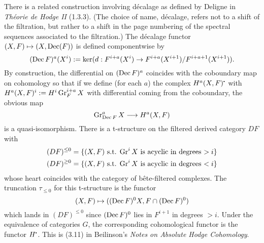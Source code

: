 \documentclass[deligne.tex]{subfiles}
\begin{document}
\begin{remark}
	There is a related construction involving
	décalage as defined by Deligne in \emph{Théorie de Hodge II} (1.3.3).
	(The choice of name, décalage, refers not to a shift of the filtration,
	but rather to a shift in the page numbering of the spectral sequences
	associated to the filtration.) The décalage functor
	$(X,F)\mapsto(X,\operatorname{Dec}(F))$ is defined componentwise by
	\begin{equation*}
		(\operatorname{Dec} F)^a(X^i)
		:=\ker(d:F^{i+a}(X^i)\rightarrow F^{i+a}(X^{i+1})/F^{i+a+1}(X^{i+1})).
	\end{equation*}
	By construction, the differential on $(\operatorname{Dec} F)^a$ coincides with the
	coboundary map on cohomology so that if we define (for each $a$) the
	complex $H^a(X,F)^\dotp$ with $H^a(X,F)^i:=H^i\operatorname{Gr}_F^{i+a}X$ with
	differential coming from the coboundary, the obvious map
	\begin{equation*}
		\operatorname{Gr}_{\operatorname{Dec} F}^aX\longrightarrow H^a(X,F)
	\end{equation*}
	is a quasi-isomorphism.
	There is a t-structure on the filtered derived category $DF$ with
	\begin{align*}
		&(DF)^{\leq0}=\{(X,F)\text{ s.t. $\operatorname{Gr}^iX$ is acyclic in degrees $>i$}\} \\
		&(DF)^{\geq0}=\{(X,F)\text{ s.t. $\operatorname{Gr}^iX$ is acyclic in degrees $<i$}\}
	\end{align*}
	whose heart coincides with the category of bête-filtered complexes.
	The truncation $\tau_{\leq0}$ for this t-structure is the functor
	\begin{equation*}
		(X,F)\mapsto((\operatorname{Dec} F)^0X,F\cap(\operatorname{Dec} F)^0)
	\end{equation*}
	which lands in $(DF)^{\leq0}$ since $(\operatorname{Dec} F)^0$ lies in $F^{i+1}$
	in degrees $>i$.
	Under the equivalence of categories $G$, the corresponding cohomological
	functor is the functor $H^\dotp$.
	This is (3.11) in Beilinson's \emph{Notes on Absolute Hodge Cohomology}.
\end{remark}
\end{document}
